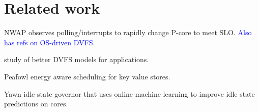 \section{Related work}
\label{rw}
NWAP\cite{10.1145/3466752.3480098} observes polling/interrupts to rapidly change P-core to meet SLO.
\textcolor{blue}{Also has refs on OS-driven DVFS}.

\cite{KARPOWICZ2018302} study of better DVFS models for applications. 

Peafowl\cite{10.1145/3419111.3421298} energy aware scheduling for key value stores. 

Yawn\cite{10.1145/3343737.3343740} idle state governor that uses online machine learning to improve idle state predictions on cores.